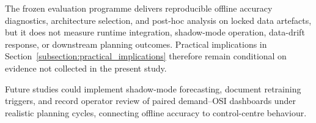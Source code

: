The frozen evaluation programme delivers reproducible offline accuracy diagnostics, architecture selection, and post-hoc analysis on locked data artefacts, but it does not measure runtime integration, shadow-mode operation, data-drift response, or downstream planning outcomes. Practical implications in Section~\ref{subsection:practical_implications} therefore remain conditional on evidence not collected in the present study.

Future studies could implement shadow-mode forecasting, document retraining triggers, and record operator review of paired demand--OSI dashboards under realistic planning cycles, connecting offline accuracy to control-centre behaviour.
